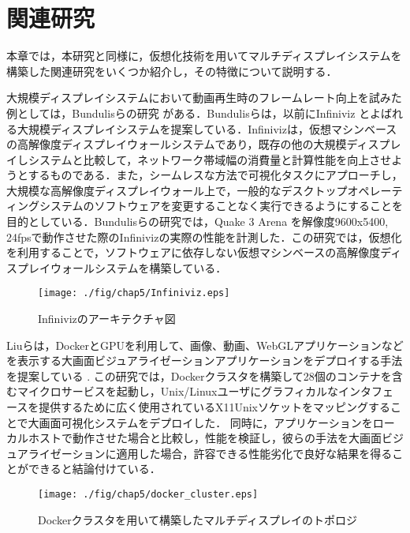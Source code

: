 \chapter{関連研究}

本章では，本研究と同様に，仮想化技術を用いてマルチディスプレイシステムを構築した関連研究をいくつか紹介し，その特徴について説明する．

大規模ディスプレイシステムにおいて動画再生時のフレームレート向上を試みた例としては，Bundulisらの研究 \cite{bundulis2018infiniviz}がある．Bundulisらは，以前にInfiniviz \cite{bundulis2016infiniviz}とよばれる大規模ディスプレイシステムを提案している．Infinivizは，仮想マシンベースの高解像度ディスプレイウォールシステムであり，既存の他の大規模ディスプレイしシステムと比較して，ネットワーク帯域幅の消費量と計算性能を向上させようとするものである．また，シームレスな方法で可視化タスクにアプローチし，大規模な高解像度ディスプレイウォール上で，一般的なデスクトップオペレーティングシステムのソフトウェアを変更することなく実行できるようにすることを目的としている．Bundulisらの研究では，Quake 3 Arena \cite{quake3arena}を解像度9600x5400, 24fpsで動作させた際のInfinivizの実際の性能を計測した．この研究では，仮想化を利用することで，ソフトウェアに依存しない仮想マシンベースの高解像度ディスプレイウォールシステムを構築している．

\begin{figure}[H]
    \hspace*{\fill}
    \texttt{[image: ./fig/chap5/Infiniviz.eps]}
    \hspace*{\fill}
    \caption{Infinivizのアーキテクチャ図}
\end{figure}

\clearpage

Liuらは，DockerとGPUを利用して、画像、動画、WebGLアプリケーションなどを表示する大画面ビジュアライゼーションアプリケーションをデプロイする手法を提案している \cite{Liu_2019}.
この研究では，Dockerクラスタを構築して28個のコンテナを含むマイクロサービスを起動し，Unix/Linuxユーザにグラフィカルなインタフェースを提供するために広く使用されているX11Unixソケットをマッピングすることで大画面可視化システムをデプロイした．
同時に，アプリケーションをローカルホストで動作させた場合と比較し，性能を検証し，彼らの手法を大画面ビジュアライゼーションに適用した場合，許容できる性能劣化で良好な結果を得ることができると結論付けている．

\begin{figure}[H]
    \hspace*{\fill}
    \texttt{[image: ./fig/chap5/docker\_cluster.eps]}
    \hspace*{\fill}
    \caption{Dockerクラスタを用いて構築したマルチディスプレイのトポロジ}
\end{figure}